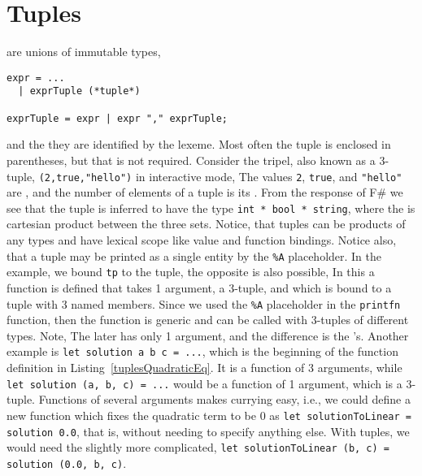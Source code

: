 \section{Tuples}
 are unions of immutable types, 
%
\begin{lstlisting}[language=ebnf]
expr = ... 
  | exprTuple (*tuple*)

exprTuple = expr | expr "," exprTuple;
\end{lstlisting}
%
and the they are identified by the \lexeme{,} lexeme. Most often the tuple is enclosed in parentheses, but that is not required. Consider the tripel, also known as a 3-tuple, \lstinline!(2,true,"hello")! in interactive mode,
%
%
The values \lstinline!2!, \lstinline!true!, and \lstinline!"hello"! are , and the number of elements of a tuple is its . From the response of F\# we see that the tuple is inferred to have the type \lstinline!int * bool * string!, where the \lexeme{*} is cartesian product between the three sets.  Notice, that tuples can be products of any types and have lexical scope like value and function bindings. Notice also, that a tuple may be printed as a single entity by the \lstinline!%A! placeholder. In the example, we bound \lstinline!tp! to the tuple, the opposite is also possible,
%
%
In this a function is defined that takes 1 argument, a 3-tuple, and which is bound to a tuple with 3 named members. Since we used the \lstinline!%A! placeholder in the \lstinline!printfn! function, then the function is generic and can be called with 3-tuples of different types. Note,   The later has only 1 argument, and the difference is the \lexeme{,}'s. Another example is \lstinline!let solution a b c = ...!, which is the beginning of the function definition in Listing~\ref{tuplesQuadraticEq}. It is a function of 3 arguments, while \lstinline!let solution (a, b, c) = ...! would be a function of 1 argument, which is a 3-tuple. Functions of several arguments makes currying easy, i.e., we could define a new function which fixes the quadratic term to be 0 as \lstinline!let solutionToLinear = solution 0.0!, that is, without needing to specify anything else. With tuples, we would need the slightly more complicated, \lstinline!let solutionToLinear (b, c) = solution (0.0, b, c)!.


